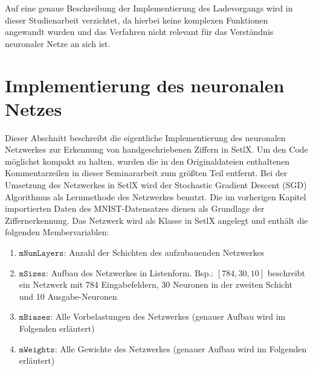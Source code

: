 \noindent
Auf eine genaue Beschreibung der Implementierung des Ladevorgangs wird in dieser Studienarbeit verzichtet, da hierbei keine komplexen Funktionen angewandt wurden und das Verfahren nicht relevant für das Verständnis neuronaler Netze an sich ist.

\section{Implementierung des neuronalen Netzes}
Dieser Abschnitt beschreibt die eigentliche Implementierung des neuronalen Netzwerkes zur Erkennung von handgeschriebenen Ziffern in SetlX. Um den Code möglichst kompakt zu halten, wurden die in den Originaldateien enthaltenen Kommentarzeilen in dieser Seminararbeit zum größten Teil entfernt.
Bei der Umsetzung des Netzwerkes in SetlX wird der Stochastic Gradient Descent (SGD) Algorithmus als Lernmethode des Netzwerkes benutzt. Die im vorherigen Kapitel importierten Daten des MNIST-Datensatzes dienen als Grundlage der Ziffernerkennung. 
Das Netzwerk wird als Klasse in SetlX angelegt und enthält die folgenden Membervariablen:

\begin{enumerate}
\item $\mathtt{mNumLayers}$: Anzahl der Schichten des aufzubauenden Netzwerkes 
\item $\mathtt{mSizes}$: Aufbau des Netzwerkes in Listenform. Bsp.: $[784, 30, 10]$ beschreibt ein Netzwerk mit 784 Eingabefeldern, 30 Neuronen in der zweiten Schicht und 10 Ausgabe-Neuronen
\item $\mathtt{mBiases}$: Alle Vorbelastungen des Netzwerkes (genauer Aufbau wird im Folgenden erläutert)
\item $\mathtt{mWeights}$: Alle Gewichte des Netzwerkes (genauer Aufbau wird im Folgenden erläutert)
\end{enumerate}

